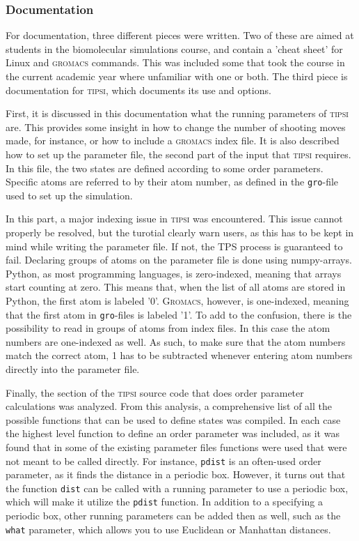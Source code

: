 \documentclass[]{article}
\begin{document}
\subsubsection*{Documentation}

For documentation, three different pieces were written. Two of these are aimed at students in the biomolecular simulations course, and contain a 'cheat sheet' for Linux and \textsc{gromacs} commands. This was included some that took the course in the current academic year where unfamiliar with one or both. The third piece is documentation for \textsc{tipsi}, which documents its use and options.

First, it is discussed in this documentation what the running parameters of \textsc{tipsi} are. This provides some insight in how to change the number of shooting moves made, for instance, or how to include a \textsc{gromacs} index file. It is also described how to set up the parameter file, the second part of the input that \textsc{tipsi} requires. In this file, the two states are defined according to some order parameters. Specific atoms are referred to by their atom number, as defined in the \texttt{gro}-file used to set up the simulation.

In this part, a major indexing issue in \textsc{tipsi} was encountered. This issue cannot properly be resolved, but the turotial clearly warn users, as this has to be kept in mind while writing the parameter file. If not, the TPS process is guaranteed to fail. Declaring groups of atoms on the parameter file is done using numpy-arrays.  Python, as most programming languages, is zero-indexed, meaning that arrays start counting at zero. This means that, when the list of all atoms are stored in Python, the first atom is labeled '0'. \textsc{Gromacs}, however, is one-indexed, meaning that the first atom in \texttt{gro}-files is labeled '1'. To add to the confusion, there is the possibility to read in groups of atoms from index files. In this case the atom numbers are one-indexed as well. As such, to make sure that the atom numbers match the correct atom, 1 has to be subtracted whenever entering atom numbers directly into the parameter file.

Finally, the section of the \textsc{tipsi} source code that does order parameter calculations was analyzed. From this analysis, a comprehensive list of all the possible functions that can be used to define states was compiled. In each case the highest level function to define an order parameter was included, as it was found that in some of the existing parameter files functions were used that were not meant to be called directly. For instance, \texttt{pdist} is an often-used order parameter, as it finds the distance in a periodic box. However, it turns out that the function \texttt{dist} can be called with a running parameter to use a periodic box, which will make it utilize the \texttt{pdist} function. In addition to a specifying a periodic box, other running parameters can be added then as well, such as the \texttt{what} parameter, which allows you to use Euclidean or Manhattan distances.
\end{document}
